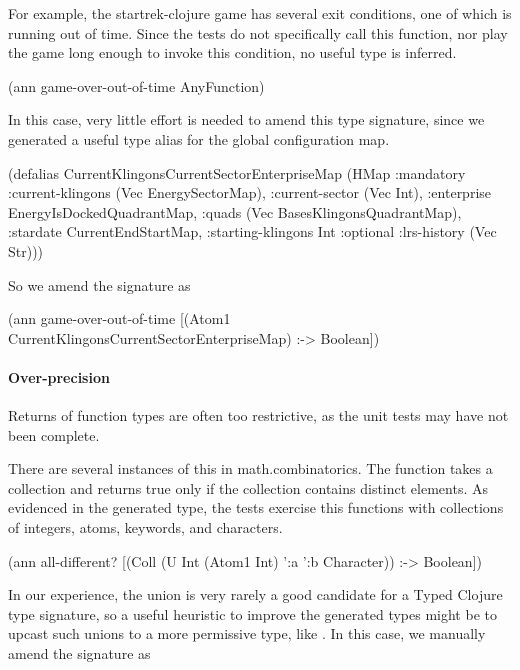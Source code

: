 For example, the startrek-clojure game has several exit
conditions, one of which is running out of time.
Since the tests do not specifically call this function,
nor play the game long enough to invoke this condition,
no useful type is inferred.

\begin{cljlisting}
(ann game-over-out-of-time AnyFunction)
\end{cljlisting}

In this case, very little effort is needed to amend this
type signature, since we generated a useful type alias
for the global configuration map.

\begin{cljlisting}
(defalias CurrentKlingonsCurrentSectorEnterpriseMap
  (HMap :mandatory
    {:current-klingons (Vec EnergySectorMap), :current-sector (Vec Int), 
     :enterprise EnergyIsDockedQuadrantMap, :quads (Vec BasesKlingonsQuadrantMap), 
     :stardate CurrentEndStartMap, :starting-klingons Int}
    :optional 
		{:lrs-history (Vec Str)}))
\end{cljlisting}

So we amend the signature as

\begin{cljlisting}
(ann game-over-out-of-time [(Atom1 CurrentKlingonsCurrentSectorEnterpriseMap) :-> Boolean])
\end{cljlisting}


\paragraph{Over-precision}
Returns of function types are often too restrictive, as the unit
tests may have not been complete.

There are several instances of this in math.combinatorics.
The  function
takes a collection and returns true only if the collection
contains distinct elements.
As evidenced in the generated type, the tests exercise
this functions with collections of integers, atoms,
keywords, and characters.

\begin{cljlisting}
(ann all-different? [(Coll (U Int (Atom1 Int) ':a ':b Character)) :-> Boolean])
\end{cljlisting}

In our experience, the union is very rarely a good candidate
for a Typed Clojure type signature, so a useful heuristic to improve
the generated types might be to upcast such unions to a more permissive
type, like . 
In this case, we manually amend the signature as

